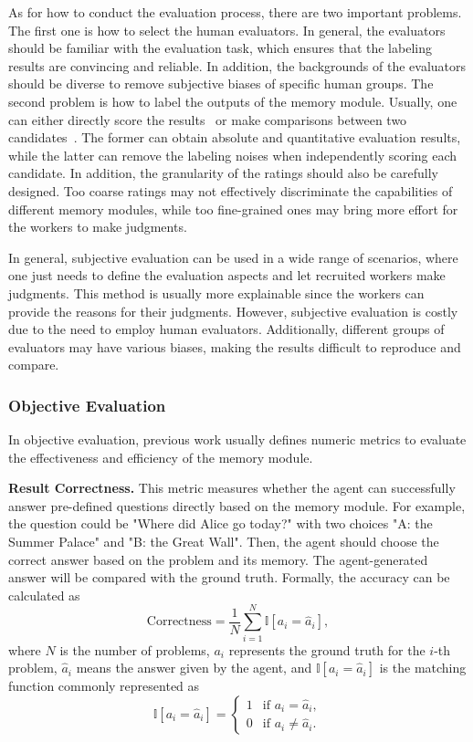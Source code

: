 \documentclass{article}
\theoremstyle{definition}
\theoremstyle{theorem}
\theoremstyle{proof}
\theoremstyle{remark}
\begin{document}
	As for how to conduct the evaluation process, there are two important problems.
	The first one is how to select the human evaluators. 
	In general, the evaluators should be familiar with the evaluation task, which ensures that the labeling results are convincing and reliable. 
	In addition, the backgrounds of the evaluators should be diverse to remove subjective biases of specific human groups. 
	The second problem is how to label the outputs of the memory module. Usually, one can either directly score the results~\cite{memorybank} or make comparisons between two candidates~\cite{recagent}.
	The former can obtain absolute and quantitative evaluation results, while the latter can remove the labeling noises when independently scoring each candidate. 
	In addition, the granularity of the ratings should also be carefully designed. Too coarse ratings may not effectively discriminate the capabilities of different memory modules, while too fine-grained ones may bring more effort for the workers to make judgments.
	
	In general, subjective evaluation can be used in a wide range of scenarios, where one just needs to define the evaluation aspects and let recruited workers make judgments. 
	This method is usually more explainable since the workers can provide the reasons for their judgments. 
	However, subjective evaluation is costly due to the need to employ human evaluators. Additionally, different groups of evaluators may have various biases, making the results difficult to reproduce and compare.
	
	\subsubsection{Objective Evaluation}
	In objective evaluation, previous work usually defines numeric metrics to evaluate the effectiveness and efficiency of the memory module.
	
	\textbf{Result Correctness.} This metric measures whether the agent can successfully answer pre-defined questions directly based on the memory module.
	For example, the question could be "Where did Alice go today?" with two choices "A: the Summer Palace" and "B: the Great Wall". Then, the agent should choose the correct answer based on the problem and its memory.
	The agent-generated answer will be compared with the ground truth. Formally, the accuracy can be calculated as
	$$
	\text{Correctness} = \frac{1}{N} \sum_{i=1}^N \mathbb{I}\left [a_i = \hat{a}_i \right ],
	$$
	where $N$ is the number of problems, $a_i$ represents the ground truth for the $i$-th problem, $\hat{a}_i$ means the answer given by the agent, and $\mathbb{I}\left [a_i = \hat{a}_i \right ]$ is the matching function commonly represented as
	$$
	\mathbb{I}\left [a_i = \hat{a}_i \right ] = \begin{cases}
		1 & \text{if } a_i = \hat{a}_i, \\
		0 & \text{if } a_i \neq \hat{a}_i.
	\end{cases}
	$$
	
\end{document}
